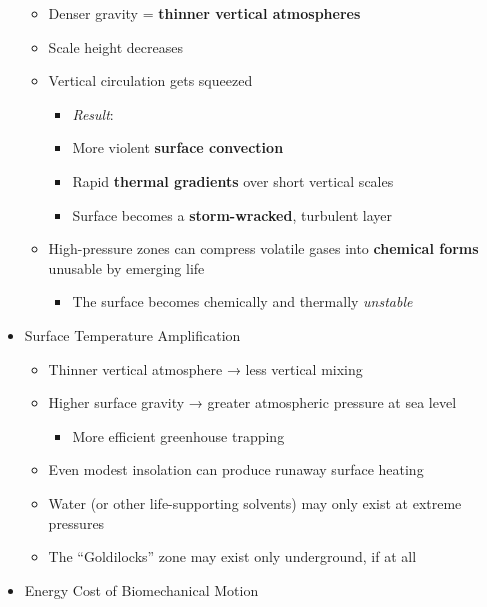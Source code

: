 \documentclass[
  letterpaper,
]{book}
\providecommand{\tightlist}{%
  \setlength{\itemsep}{0pt}\setlength{\parskip}{0pt}}
\begin{document}
\begin{itemize}
  \begin{itemize}
  \tightlist
  \item
    Denser gravity = \textbf{thinner vertical atmospheres}\\
  \item
    Scale height decreases\\
  \item
    Vertical circulation gets squeezed

    \begin{itemize}
    \tightlist
    \item
      \emph{Result}:\\
    \item
      More violent \textbf{surface convection}
    \item
      Rapid \textbf{thermal gradients} over short vertical scales
    \item
      Surface becomes a \textbf{storm-wracked}, turbulent layer
    \end{itemize}
  \item
    High-pressure zones can compress volatile gases into
    \textbf{chemical forms} unusable by emerging life

    \begin{itemize}
    \tightlist
    \item
      The surface becomes chemically and thermally \emph{unstable}
    \end{itemize}
  \end{itemize}
\item
  Surface Temperature Amplification

  \begin{itemize}
  \tightlist
  \item
    Thinner vertical atmosphere → less vertical mixing
  \item
    Higher surface gravity → greater atmospheric pressure at sea level

    \begin{itemize}
    \tightlist
    \item
      More efficient greenhouse trapping
    \end{itemize}
  \item
    Even modest insolation can produce runaway surface heating
  \item
    Water (or other life-supporting solvents) may only exist at extreme
    pressures
  \item
    The ``Goldilocks'' zone may exist only underground, if at all
  \end{itemize}
\item
  Energy Cost of Biomechanical Motion


\end{itemize}
\end{document}
